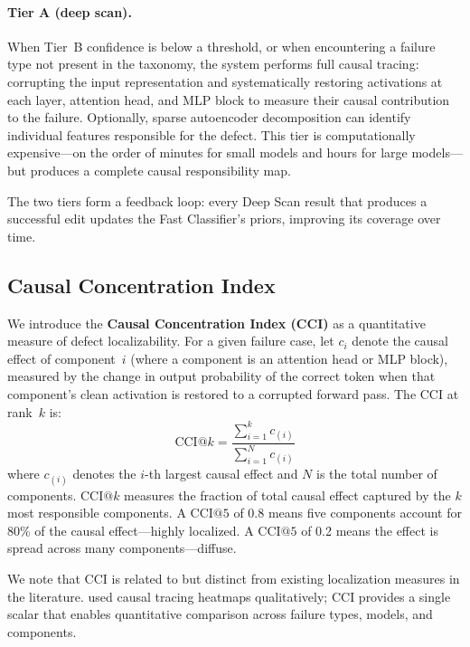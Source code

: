 \documentclass[11pt]{article}
\begin{document}
\paragraph{Tier A (deep scan).} When Tier~B confidence is below a threshold, or when encountering a failure type not present in the taxonomy, the system performs full causal tracing: corrupting the input representation and systematically restoring activations at each layer, attention head, and MLP block to measure their causal contribution to the failure. Optionally, sparse autoencoder decomposition can identify individual features responsible for the defect. This tier is computationally expensive---on the order of minutes for small models and hours for large models---but produces a complete causal responsibility map.

The two tiers form a feedback loop: every Deep Scan result that produces a successful edit updates the Fast Classifier's priors, improving its coverage over time.

\subsection{Causal Concentration Index}

We introduce the \textbf{Causal Concentration Index (CCI)} as a quantitative measure of defect localizability. For a given failure case, let $c_i$ denote the causal effect of component~$i$ (where a component is an attention head or MLP block), measured by the change in output probability of the correct token when that component's clean activation is restored to a corrupted forward pass. The CCI at rank~$k$ is:
%
\begin{equation}
  \text{CCI}@k = \frac{\sum_{i=1}^{k} c_{(i)}}{\sum_{i=1}^{N} c_{(i)}}
  \label{eq:cci}
\end{equation}
%
where $c_{(i)}$ denotes the $i$-th largest causal effect and $N$ is the total number of components. $\text{CCI}@k$ measures the fraction of total causal effect captured by the $k$ most responsible components. A $\text{CCI}@5$ of 0.8 means five components account for 80\% of the causal effect---highly localized. A $\text{CCI}@5$ of 0.2 means the effect is spread across many components---diffuse.

We note that CCI is related to but distinct from existing localization measures in the literature. \citet{meng2022locating} used causal tracing heatmaps qualitatively; CCI provides a single scalar that enables quantitative comparison across failure types, models, and components.
\end{document}
